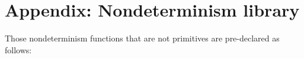 \section*{Appendix: Nondeterminism library}

Those nondeterminism functions that are not primitives are pre-declared as follows:




